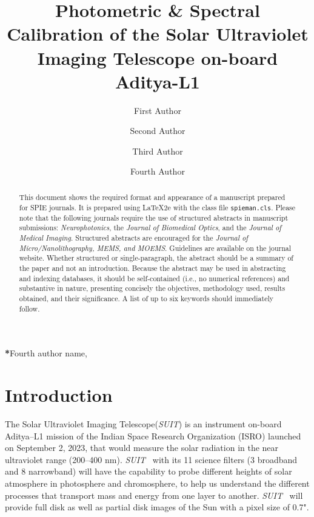 \documentclass[12pt]{spieman}  %
\title{Photometric \& Spectral Calibration of the Solar Ultraviolet Imaging Telescope on-board Aditya-L1}
\author[a]{First Author}
\author[a]{Second Author}
\author[b]{Third Author}
\author[a,b,*]{Fourth Author}
\affil[a]{University Name, Faculty Group, Department, Street Address, City, Country, Postal Code}
\affil[b]{Company Name, Street Address, City, Country, Postal Code}
\newcommand{\suit}{{\it{SUIT}}}
\begin{document}
 
\maketitle

\begin{abstract}
This document shows the required format and appearance of a manuscript prepared for SPIE journals. It is prepared using LaTeX2e with the class file \texttt{spieman.cls}. Please note that the following journals require the use of structured abstracts in manuscript submissions: \textit{Neurophotonics}, the \textit{Journal of Biomedical Optics}, and the \textit{Journal of Medical Imaging}. Structured abstracts are encouraged for the \textit{Journal of Micro/Nanolithography, MEMS, and MOEMS}. Guidelines are available on the journal website. Whether structured or single-paragraph, the abstract should be a summary of the paper and not an introduction. Because the abstract may be used in abstracting and indexing databases, it should be self-contained (i.e., no numerical references) and substantive in nature, presenting concisely the objectives, methodology used, results obtained, and their significance. A list of up to six keywords should immediately follow. 
\end{abstract}


{\noindent \footnotesize\textbf{*}Fourth author name,   }


\section{Introduction}\label{sec:intro}

The Solar Ultraviolet Imaging Telescope(\suit) \cite{ghosh16,article} is an instrument on-board Aditya{--}L1 mission \cite{adityal1,aditya} of the Indian Space Research Organization (ISRO) launched on September 2, 2023, that would measure the solar radiation in the near ultraviolet range (200{--}400 nm). \suit~ with its 11 science filters (3 broadband and 8 narrowband) will have the capability to probe different heights of solar atmosphere in photosphere and chromosphere, to help us understand the different processes that transport mass and energy from one layer to another. \suit~ will provide full disk as well as partial disk images of the Sun with a pixel size of 0.7".
\end{document}

